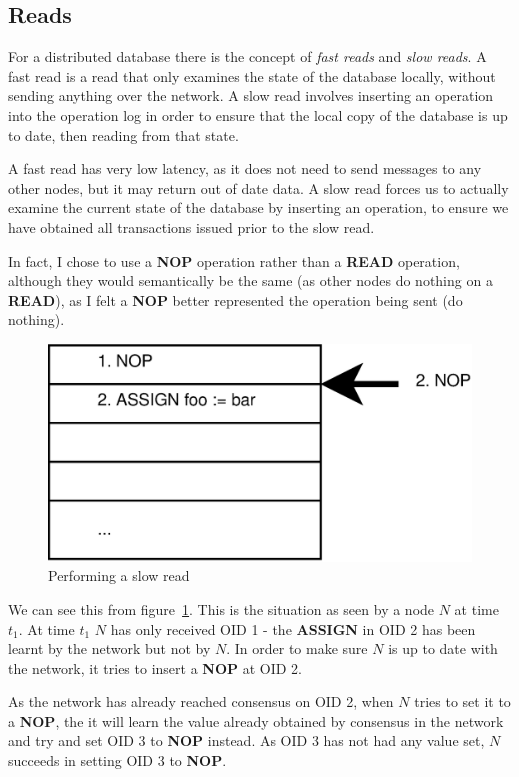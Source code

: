 \documentclass[12pt,twoside,notitlepage]{report}
\newcommand{\op}[1]  {{\bf #1}}         %
\begin{document}
\subsection{Reads}

For a distributed database there is the concept of \emph{fast reads} and \emph{slow reads}. A fast
read is a read that only examines the state of the database locally, without sending anything over
the network.  A slow read involves inserting an operation into the operation log in order to
ensure that the local copy of the database is up to date, then reading from that state.

A fast read has very low latency, as it does not need to send messages to any other nodes, but it
may return out of date data. A slow read forces us to actually examine the current state of the
database by inserting an operation, to ensure we have obtained all transactions issued
prior to the slow read.

In fact, I chose to use a \op{NOP} operation rather than a \op{READ} operation, although they
would semantically be the same (as other nodes do nothing on a \op{READ}), as I felt a \op{NOP}
better represented the operation being sent (do nothing).

\begin{figure}[htb]
\centering
\includegraphics[scale=0.5]{figs/op-log-slow-read-1.eps}
\caption{\label{fig:op-log-slow-read-1}Performing a slow read}
\end{figure}

We can see this from figure~\ref{fig:op-log-slow-read-1}. This is the situation as seen by a node
$N$ at time $t_1$. At time $t_1$ $N$ has only received OID 1 - the \op{ASSIGN} in OID 2 has been
learnt by the network but not by $N$. In order to make sure $N$ is up to date with the network, it
tries to insert a \op{NOP} at OID 2.

As the network has already reached consensus on OID 2, when $N$ tries to set it to a \op{NOP}, the
it will learn the value already obtained by consensus in the network and try and set OID 3 to
\op{NOP} instead. As OID 3 has not had any value set, $N$ succeeds in setting OID 3 to \op{NOP}.
\end{document}
